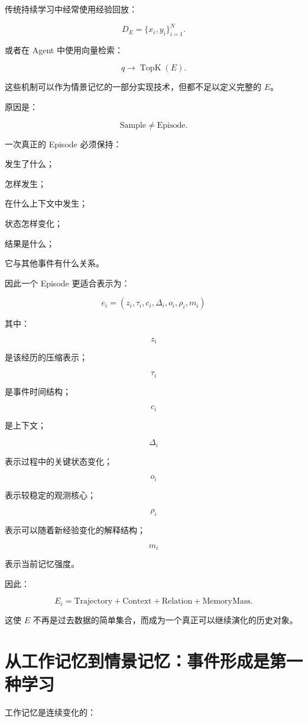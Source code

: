 传统持续学习中经常使用经验回放：

\[
D_E
=
\{
x_i,y_i
\}_{i=1}^{N}.
\]

或者在 Agent 中使用向量检索：

\[
q
\rightarrow
\operatorname{TopK}(E).
\]

这些机制可以作为情景记忆的一部分实现技术，但都不足以定义完整的 \(E\)。

原因是：

\[
\boxed{
\text{Sample}\neq\text{Episode}.
}
\]

一次真正的 Episode 必须保持：

发生了什么；

怎样发生；

在什么上下文中发生；

状态怎样变化；

结果是什么；

它与其他事件有什么关系。

因此一个 Episode 更适合表示为：

\[
\boxed{
e_i
=
(
z_i,
\tau_i,
c_i,
\Delta_i,
o_i,
\rho_i,
m_i
)
}
\]

其中：

\[
z_i
\]

是该经历的压缩表示；

\[
\tau_i
\]

是事件时间结构；

\[
c_i
\]

是上下文；

\[
\Delta_i
\]

表示过程中的关键状态变化；

\[
o_i
\]

表示较稳定的观测核心；

\[
\rho_i
\]

表示可以随着新经验变化的解释结构；

\[
m_i
\]

表示当前记忆强度。

因此：

\[
\boxed{
E_i
=
\text{Trajectory}
+
\text{Context}
+
\text{Relation}
+
\text{MemoryMass}.
}
\]

这使 \(E\) 不再是过去数据的简单集合，而成为一个真正可以继续演化的历史对象。


\section{从工作记忆到情景记忆：事件形成是第一种学习}

工作记忆是连续变化的：

